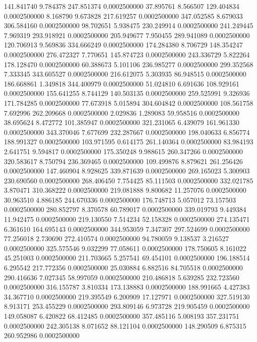 141.841740 9.784378 247.851374 0.0002500000
37.895761 8.566507 129.404834 0.0002500000
8.168790 9.673828 217.619257 0.0002500000
347.052585 8.679033 306.584160 0.0002500000
98.702651 5.938475 230.249914 0.0002500000
241.249445 7.969319 293.918921 0.0002500000
205.949677 7.950455 289.941089 0.0002500000
120.706913 9.569836 334.666249 0.0002500000
174.284380 8.706729 148.354247 0.0002500000
276.472327 7.770651 145.874723 0.0002500000
243.336729 5.822264 178.128470 0.0002500000
60.388673 5.101106 236.985277 0.0002500000
299.352568 7.333345 343.605527 0.0002500000
216.612075 5.303935 86.948515 0.0002500000
186.668861 1.349818 344.400979 0.0002500000
51.024810 6.691636 108.929161 0.0002500000
155.641255 8.744129 140.503135 0.0002500000
259.525991 9.326936 171.784285 0.0002500000
77.673918 5.015894 304.604842 0.0002500000
108.561758 7.692996 262.209668 0.0002500000
2.029836 1.289083 59.958516 0.0002500000
38.695624 8.472772 101.385947 0.0002500000
321.231065 6.439079 161.961330 0.0002500000
343.370046 7.677699 232.287667 0.0002500000
198.040633 6.856774 188.991327 0.0002500000
103.971595 0.614175 261.140364 0.0002500000
83.984193 2.641751 9.594817 0.0002500000
175.350248 9.988615 260.347266 0.0002500000
320.583617 8.750794 236.369465 0.0002500000
109.499876 8.879621 261.256426 0.0002500000
147.460904 8.928625 339.871639 0.0002500000
269.165023 5.300903 230.690560 0.0002500000
268.406450 7.754425 85.111503 0.0002500000
332.021785 3.870471 310.368222 0.0002500000
219.081888 9.800682 11.257076 0.0002500000
30.963510 4.886185 244.670336 0.0002500000
176.748713 5.057012 73.157503 0.0002500000
280.852797 8.370578 60.789017 0.0002500000
339.019793 9.449384 11.942475 0.0002500000
219.130550 7.514234 52.158328 0.0002500000
274.135471 6.361610 164.695143 0.0002500000
344.953059 7.347307 297.524699 0.0002500000
77.256018 2.730690 272.410574 0.0002500000
94.780059 9.138537 3.216527 0.0002500000
325.575546 9.032299 77.058611 0.0002500000
178.750605 8.161022 45.251003 0.0002500000
211.703665 5.257541 69.454101 0.0002500000
196.188514 6.295542 217.772356 0.0002500000
25.030884 6.882516 84.705518 0.0002500000
290.416636 7.027345 58.997059 0.0002500000
210.486818 5.639285 232.723560 0.0002500000
316.155787 3.810334 173.138883 0.0002500000
188.991665 4.427383 34.367710 0.0002500000
219.395549 6.200909 17.127971 0.0002500000
327.519130 8.913171 253.455229 0.0002500000
293.809146 6.973728 219.905459 0.0002500000
149.058087 6.420822 68.412485 0.0002500000
357.485116 5.008193 357.231751 0.0002500000
242.305138 8.071652 88.121104 0.0002500000
148.290509 6.875315 260.952986 0.0002500000
